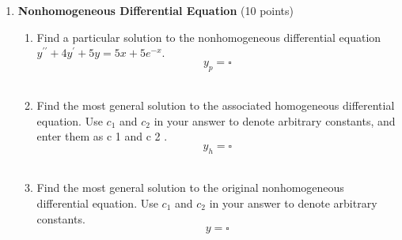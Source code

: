 \begin{enumerate}
  \item \textbf{Nonhomogeneous Differential Equation} (10 points)\\
  \begin{enumerate}[label=\alph*]
    \item Find a particular solution to the nonhomogeneous differential equation $y^{\prime \prime}+4 y^{\prime}+5 y=5 x+5 e^{-x}$.\\
    $$
    y_p=\square
    $$\\
    \begin{subanswer}
    \end{subanswer}
    \item Find the most general solution to the associated homogeneous differential equation. Use $c_1$ and $c_2$ in your answer to denote arbitrary constants, and enter them as c 1 and c 2 .\\
    $$
    y_h=\square
    $$\\
    \begin{subanswer}
    \end{subanswer}
    \item Find the most general solution to the original nonhomogeneous differential equation. Use $c_1$ and $c_2$ in your answer to denote arbitrary constants.\\
    $$
    y=\square
    $$\\
    \begin{subanswer}
    \end{subanswer}
  \end{enumerate}


\end{enumerate}
